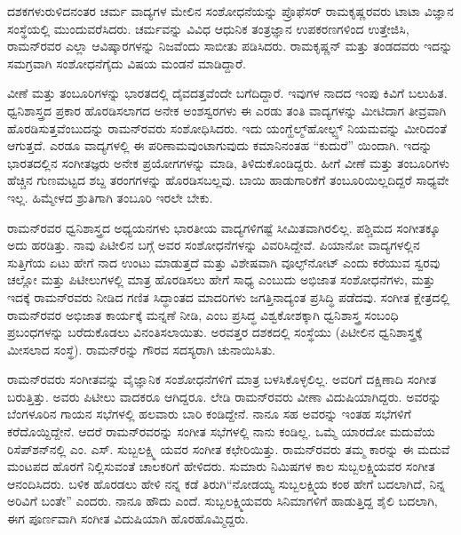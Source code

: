 ದಶಕಗಳುರುಳಿದನಂತರ ಚರ್ಮ ವಾದ್ಯಗಳ ಮೇಲಿನ ಸಂಶೋಧನೆಯನ್ನು ಪ್ರೊಫೆಸರ್ ರಾಮಕೃಷ್ಣರವರು ಟಾಟಾ ವಿಜ್ಞಾನ ಸಂಸ್ಥೆಯಲ್ಲಿ ಮುಂದುವರೆಸಿದರು. ಚರ್ಮವನ್ನು ವಿವಿಧ ಆಧುನಿಕ ತಂತ್ರಜ್ಞಾನ ಉಪಕರಣಗಳಿಂದ ಉತ್ತೇಜಿಸಿ, ರಾಮನ್‍ರವರ ಎಲ್ಲಾ ಆವಿಷ್ಕಾರಗಳನ್ನು ನಿಜವೆಂದು ಸಾಬೀತು ಪಡಿಸಿದರು. ರಾಮಕೃಷ್ಣನ್ ಮತ್ತು ತಂಡದವರು ಇದನ್ನು ಸಮಗ್ರವಾಗಿ ಸಂಶೋಧನೆಗೈದು ವಿಷಯ ಮಂಡನೆ ಮಾಡಿದ್ದಾರೆ.

ವೀಣೆ ಮತ್ತು ತಂಬೂರಿಗಳನ್ನು ಭಾರತದಲ್ಲಿ ದೈವದತ್ತವೆಂದೇ ಬಗೆದಿದ್ದಾರೆ. ಇವುಗಳ ನಾದದ ಇಂಪು ಕಿವಿಗೆ ಬಲುಹಿತ. ಧ್ವನಿಶಾಸ್ತ್ರದ ಪ್ರಕಾರ ಹೊರಡಿಸಲಾಗದ ಅನೇಕ ಅಂಶಸ್ವರಗಳು ಈ ಎರಡು ತಂತಿ ವಾದ್ಯಗಳನ್ನು ಮೀಟಿದಾಗ ತೀವ್ರವಾಗಿ ಹೊರಡಿಸುತ್ತವೆಂಬುದನ್ನು ರಾಮನ್‍ರವರು ಸಂಶೋಧಿಸಿದರು. ಇದು ಯಂಗ್\enginline{-}ಹೆಲ್ಮ್‌ಹೋಲ್ಟ್ಸ್ ನಿಯಮವನ್ನು ಮೀರಿದಂತೆ ಆಗುತ್ತದೆ. ಎರಡೂ ವಾದ್ಯಗಳಲ್ಲಿ ಈ ಪರಿಣಾಮವುಂಟಾಗುವುದು ಕಮಾನಿನಂತಹ “ಕುದುರೆ” ಯಿಂದಾಗಿ. ಇದನ್ನು ಭಾರತದಲ್ಲಿನ ಸಂಗೀತಜ್ಞರು ಅನೇಕ ಪ್ರಯೋಗಗಳನ್ನು ಮಾಡಿ, ತಿಳಿದುಕೊಂಡಿದ್ದರು. ಹೀಗೆ ವೀಣೆ ಮತ್ತು ತಂಬೂರಿಗಳು ಹೆಚ್ಚಿನ ಗುಣಮಟ್ಟದ ಶಬ್ದ ತರಂಗಗಳನ್ನು ಹೊರಡಿಸಬಲ್ಲವು. ಬಾಯಿ ಹಾಡುಗಾರಿಕೆಗೆ ತಂಬೂರಿಯಿಲ್ಲದಿದ್ದರೆ ಸಾಧ್ಯವೇ ಇಲ್ಲ. ಹಿಮ್ಮೇಳದ ಶ್ರುತಿಗಾಗಿ ತಂಬೂರಿ ಇರಲೇ ಬೇಕು.

ರಾಮನ್‍ರವರ ಧ್ವನಿಶಾಸ್ತ್ರದ ಅಧ್ಯಯನಗಳು ಭಾರತೀಯ ವಾದ್ಯಗಳಿಗಷ್ಟೆ ಸೀಮಿತವಾಗಿರಲಿಲ್ಲ. ಪಶ್ಚಿಮದ ಸಂಗೀತಕ್ಕೂ ಅದು ಹರಡಿತ್ತು. ನಾವು ಪಿಟೀಲಿನ ಬಗ್ಗೆ ಅವರ ಸಂಶೋಧನೆಗಳನ್ನು ವಿವರಿಸಿದ್ದೇವೆ. ಪಿಯಾನೋ ವಾದ್ಯಗಳಲ್ಲಿನ ಸುತ್ತಿಗೆಯ ಏಟು ಹೇಗೆ ನಾದ ಉಂಟು ಮಾಡುತ್ತದೆ ಮತ್ತು ವಿಶೇಷವಾಗಿ ವೂಲ್ಫ್‌ನೋಟ್ ಎಂದು ಕರೆಯುವ ಸ್ವರವು ಚಲ್ಲೋ ಮತ್ತು ಪಿಟೀಲುಗಳಲ್ಲಿ ಮಾತ್ರ ಹೊರಡಿಸಲು ಹೇಗೆ ಸಾಧ್ಯ ಎಂಬುದು ಅಭಿಜಾತ ಸಂಶೋಧನೆಗಳು, ಮತ್ತು ಇದಕ್ಕೆ ರಾಮನ್‍ರವರು ನೀಡಿದ ಗಣಿತ ಸಿದ್ಧಾಂತದ ಮಾದರಿಗಳು ಜಗತ್ತಿನಾದ್ಯಂತ ಪ್ರಸಿದ್ಧಿ ಪಡೆದವು. ಸಂಗೀತ ಕ್ಷೇತ್ರದಲ್ಲಿ ರಾಮನ್‍ರವರ ಅಭಿಜಾತ ಕಾರ್ಯಕ್ಕೆ ಮನ್ನಣೆ ನೀಡಿ, \textit{} ಎಂಬ ಪ್ರಸಿದ್ಧ ವಿಶ್ವಕೋಶಕ್ಕಾಗಿ ಧ್ವನಿಶಾಸ್ತ್ರ ಸಂಬಂಧಿ ಪ್ರಬಂಧಗಳನ್ನು ಬರೆದುಕೊಡಲು ವಿನಂತಿಸಲಾಯಿತು. ಅರವತ್ತರ ದಶಕದಲ್ಲಿ  ಸಂಸ್ಥೆಯು (ಪಿಟೀಲಿನ ಧ್ವನಿಶಾಸ್ತ್ರಕ್ಕೆ ಮೀಸಲಾದ ಸಂಸ್ಥೆ). ರಾಮನ್‍ರನ್ನು ಗೌರವ ಸದಸ್ಯರಾಗಿ ಚುನಾಯಿಸಿತು.

ರಾಮನ್‍ರವರು ಸಂಗೀತವನ್ನು ವೈಜ್ಞಾನಿಕ ಸಂಶೋಧನೆಗಳಿಗೆ ಮಾತ್ರ ಬಳಸಿಕೊಳ್ಳಲಿಲ್ಲ. ಅವರಿಗೆ ದಕ್ಷಿಣಾದಿ ಸಂಗೀತ ಬರುತ್ತಿತ್ತು. ಅವರು ಪಿಟೀಲು ವಾದಕರೂ ಆಗಿದ್ದರೂ. ಲೇಡಿ ರಾಮನ್‍ರವರು ವೀಣಾ ವಿದುಷಿಯಾಗಿದ್ದರು. ಅವರನ್ನು ಬೆಂಗಳೂರಿನ ಗಾಯನ ಸಭೆಗಳಲ್ಲಿ ಹಲವಾರು ಬಾರಿ ಕಂಡಿದ್ದೇನೆ. ನಾನೂ ಸಹ ಅವರನ್ನು ಇಂತಹ ಸಭೆಗಳಿಗೆ ಕರೆದೊಯ್ದಿದ್ದೇನೆ. ಆದರೆ ರಾಮನ್‍ರವರನ್ನು ಸಂಗೀತ ಸಭೆಗಳಲ್ಲಿ ನಾನು ಕಂಡಿಲ್ಲ. ಒಮ್ಮೆ ಯಾರದೋ ಮದುವೆಯ ರಿಸೆಪ್‍ಶನ್‍ನಲ್ಲಿ ಎಂ. ಎಸ್. ಸುಬ್ಬಲಕ್ಷ್ಮಿ ಯವರ ಸಂಗೀತ ಕಛೇರಿಯಿತ್ತು. ರಾಮನ್‍ರವರು ತಮ್ಮ ಕಾರನ್ನು ಈ ಮದುವೆ ಮಂಟಪದ ಹೊರಗೆ ನಿಲ್ಲಿಸುವಂತೆ ಚಾಲಕರಿಗೆ ಹೇಳಿದರು. ಸುಮಾರು  ನಿಮಿಷಗಳ ಕಾಲ ಸುಬ್ಬಲಕ್ಷ್ಮಿಯವರ ಸಂಗೀತ ಆನಂದಿಸಿದರು. ಬಳಿಕ ಹೊರಡಲು ಹೇಳಿ ನನ್ನ ಕಡೆ ತಿರುಗಿ\enginline{-}“ನೋಡಯ್ಯ ಸುಬ್ಬಲಕ್ಷ್ಮಿಯ ಕಂಠ ಹೇಗೆ ಬದಲಾಗಿದೆ, ನಿನ್ನ ಅರಿವಿಗೆ ಬಂತೇ” ಎಂದರು. ನಾನೂ ಹೌದು ಎಂದೆ. ಸುಬ್ಬಲಕ್ಷ್ಮಿಯವರು ಸಿನಿಮಾಗಳಿಗೆ ಹಾಡುತ್ತಿದ್ದ ಶೈಲಿ ಬದಲಾಗಿ, ಈಗ ಪೂರ್ಣವಾಗಿ ಸಂಗೀತ ವಿದುಷಿಯಾಗಿ ಹೊರಹೊಮ್ಮಿದ್ದರು.

